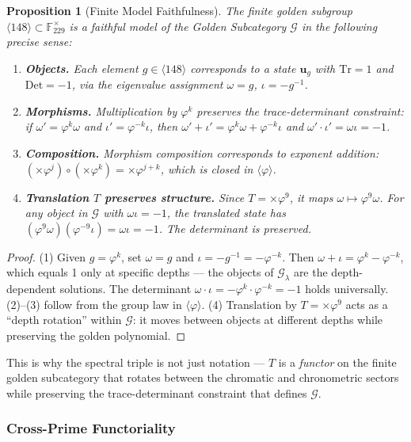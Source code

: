 \documentclass[12pt,oneside]{article}
\theoremstyle{principia}
\newtheorem{proposition}[theorem]{Proposition}
\theoremstyle{definition}
\theoremstyle{remark}
\providecommand{\FF}{\mathbb{F}}
\providecommand{\GG}{\mathcal{G}}
\providecommand{\vp}{\varphi}
\providecommand{\lam}{\lambda}
\begin{document}
\begin{proposition}[Finite Model Faithfulness]\label{prop:faithful}
The finite golden subgroup $\langle 148 \rangle \subset \FF_{229}^\times$ is a faithful model of the Golden Subcategory $\GG$ in the following precise sense:
\begin{enumerate}
\item \textbf{Objects.} Each element $g \in \langle 148 \rangle$ corresponds to a state $\mathbf{u}_g$ with $\mathrm{Tr} = 1$ and $\mathrm{Det} = -1$, via the eigenvalue assignment $\omega = g$, $\iota = -g^{-1}$.
\item \textbf{Morphisms.} Multiplication by $\vp^k$ preserves the trace-determinant constraint: if $\omega' = \vp^k \omega$ and $\iota' = \vp^{-k}\iota$, then $\omega' + \iota' = \vp^k\omega + \vp^{-k}\iota$ and $\omega' \cdot \iota' = \omega\iota = -1$.
\item \textbf{Composition.} Morphism composition corresponds to exponent addition: $(\times\vp^j) \circ (\times\vp^k) = \times\vp^{j+k}$, which is closed in $\langle\vp\rangle$.
\item \textbf{Translation $T$ preserves structure.} Since $T = \times\vp^9$, it maps $\omega \mapsto \vp^9\omega$. For any object in $\GG$ with $\omega\iota = -1$, the translated state has $(\vp^9\omega)(\vp^{-9}\iota) = \omega\iota = -1$. The determinant is preserved.
\end{enumerate}
\end{proposition}
\begin{proof}
(1) Given $g = \vp^k$, set $\omega = g$ and $\iota = -g^{-1} = -\vp^{-k}$. Then $\omega + \iota = \vp^k - \vp^{-k}$, which equals 1 only at specific depths --- the objects of $\GG_\lam$ are the depth-dependent solutions. The determinant $\omega \cdot \iota = -\vp^k \cdot \vp^{-k} = -1$ holds universally. (2)--(3) follow from the group law in $\langle\vp\rangle$. (4) Translation by $T = \times\vp^9$ acts as a ``depth rotation'' within $\GG$: it moves between objects at different depths while preserving the golden polynomial. \qedhere
\end{proof}

This is why the spectral triple is not just notation --- $T$ is a \emph{functor} on the finite golden subcategory that rotates between the chromatic and chronometric sectors while preserving the trace-determinant constraint that defines $\GG$.

\subsubsection*{Cross-Prime Functoriality}
\end{document}

